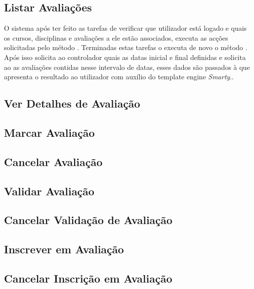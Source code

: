 \subsection{Listar Avaliações}
O sistema após ter feito as tarefas de verificar que utilizador está logado e quais os cursos, disciplinas e avaliações a ele estão associados, executa as acções solicitadas pelo método . Terminadas estas tarefas o  executa de novo o método .\\
Após isso solicita ao controlador  quais as datas inicial e final definidas e solicita ao  as avaliações contidas nesse intervalo de datas, esses dados são passados à  que apresenta o resultado ao utilizador com auxílio do template engine \textit{Smarty}..

\subsection{Ver Detalhes de Avaliação}


\subsection{Marcar Avaliação}
\subsection{Cancelar Avaliação}
\subsection{Validar Avaliação}
\subsection{Cancelar Validação de Avaliação}
\subsection{Inscrever em Avaliação}
\subsection{Cancelar Inscrição em Avaliação}